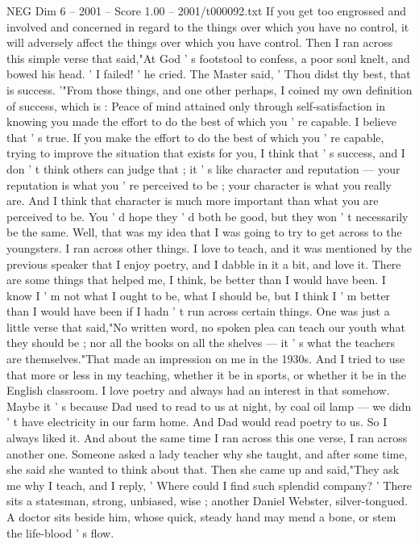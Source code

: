 \begin{textsample}{NEG Dim 6 – 2001 – Score 1.00 – 2001/t000092.txt}
If you get too engrossed and involved and concerned in regard to the things over which you have no control, it will adversely affect the things over which you have control.
Then I ran across this simple verse that said,"At God ' s footstool to confess, a poor soul knelt, and bowed his head. ' I failed! ' he cried.
The Master said, ' Thou didst thy best, that is success. '"From those things, and one other perhaps, I coined my own definition of success, which is : Peace of mind attained only through self-satisfaction in knowing you made the effort to do the best of which you ' re capable.
I believe that ' s true.
If you make the effort to do the best of which you ' re capable, trying to improve the situation that exists for you, I think that ' s success, and I don ' t think others can judge that ; it ' s like character and reputation — your reputation is what you ' re perceived to be ; your character is what you really are.
And I think that character is much more important than what you are perceived to be.
You ' d hope they ' d both be good, but they won ' t necessarily be the same.
Well, that was my idea that I was going to try to get across to the youngsters.
I ran across other things.
I love to teach, and it was mentioned by the previous speaker that I enjoy poetry, and I dabble in it a bit, and love it.
There are some things that helped me, I think, be better than I would have been.
I know I ' m not what I ought to be, what I should be, but I think I ' m better than I would have been if I hadn ' t run across certain things.
One was just a little verse that said,"No written word, no spoken plea can teach our youth what they should be ; nor all the books on all the shelves — it ' s what the teachers are themselves."That made an impression on me in the 1930s.
And I tried to use that more or less in my teaching, whether it be in sports, or whether it be in the English classroom.
I love poetry and always had an interest in that somehow.
Maybe it ' s because Dad used to read to us at night, by coal oil lamp — we didn ' t have electricity in our farm home.
And Dad would read poetry to us.
So I always liked it.
And about the same time I ran across this one verse, I ran across another one.
Someone asked a lady teacher why she taught, and after some time, she said she wanted to think about that.
Then she came up and said,"They ask me why I teach, and I reply, ' Where could I find such splendid company? ' There sits a statesman, strong, unbiased, wise ; another Daniel Webster, silver-tongued.
A doctor sits beside him, whose quick, steady hand may mend a bone, or stem the life-blood ' s flow.

\end{textsample}

